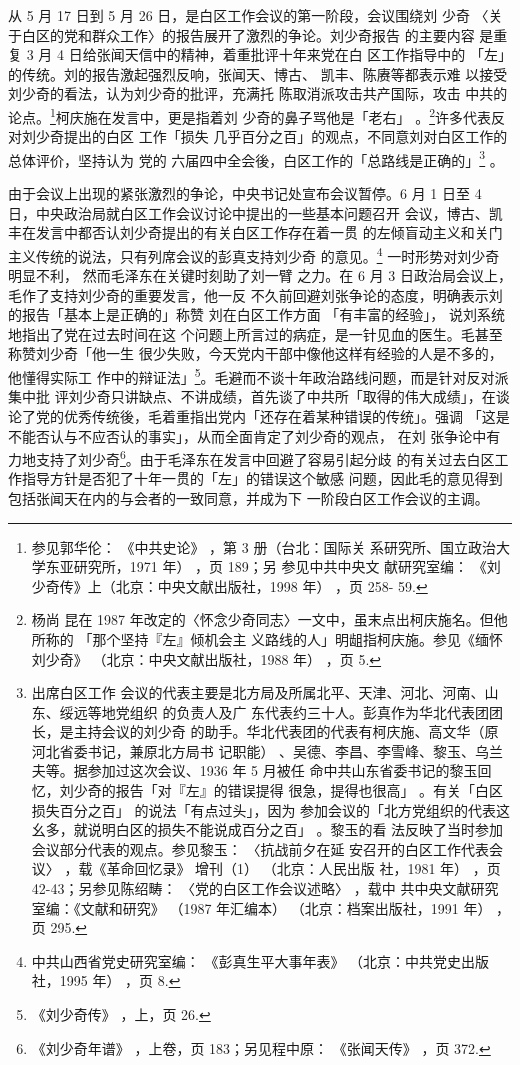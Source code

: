 从 5 月 17 日到 5 月 26 日，是白区工作会议的第一阶段，会议围绕刘 少奇
〈关于白区的党和群众工作〉的报告展开了激烈的争论。刘少奇报告 的主要内容
是重复 3 月 4 日给张闻天信中的精神，着重批评十年来党在白 区工作指导中的
「左」的传统。刘的报告激起强烈反响，张闻天、博古、 凯丰、陈赓等都表示难
以接受刘少奇的看法，认为刘少奇的批评，充满托 陈取消派攻击共产国际，攻击
中共的论点。\footnote{参见郭华伦： 《中共史论》 ，第 3 册（台北：国际关
系研究所、国立政治大学东亚研究所，1971 年） ，页 189；另 参见中共中央文
献研究室编： 《刘少奇传》上（北京：中央文献出版社，1998 年） ，页 258-
59.}柯庆施在发言中，更是指着刘 少奇的鼻子骂他是「老右」 。\footnote{杨尚
昆在 1987 年改定的〈怀念少奇同志〉一文中，虽末点出柯庆施名。但他所称的
「那个坚持『左』倾机会主 义路线的人」明龃指柯庆施。参见《缅怀刘少奇》
（北京：中央文献出版社，1988 年） ，页 5. }许多代表反对刘少奇提出的白区
工作「损失 几乎百分之百」的观点，不同意刘对白区工作的总体评价，坚持认为
党的 六届四中全会後，白区工作的「总路线是正确的」\footnote{出席白区工作
会议的代表主要是北方局及所属北平、天津、河北、河南、山东、绥远等地党组织
的负责人及广 东代表约三十人。彭真作为华北代表团团长，是主持会议的刘少奇
的助手。华北代表团的代表有柯庆施、高文华（原 河北省委书记，兼原北方局书
记职能） 、吴德、李昌、李雪峰、黎玉、乌兰夫等。据参加过这次会议、1936 年
5 月被任 命中共山东省委书记的黎玉回忆，刘少奇的报告「对『左』的错误提得
很急，提得也很高」 。有关「白区损失百分之百」 的说法「有点过头」，因为
参加会议的「北方党组织的代表这幺多，就说明白区的损失不能说成百分之百」
。黎玉的看 法反映了当时参加会议部分代表的观点。参见黎玉： 〈抗战前夕在延
安召开的白区工作代表会议〉 ，载《革命回忆录》 增刊（1） （北京：人民出版
社，1981 年） ，页 42-43；另参见陈绍畴： 〈党的白区工作会议述略〉 ，载中
共中央文献研究室编：《文献和研究》 （1987 年汇编本）
（北京：档案出版社，1991 年） ，页 295.} 。

由于会议上出现的紧张激烈的争论，中央书记处宣布会议暂停。6 月
1 日至 4 日，中央政治局就白区工作会议讨论中提出的一些基本问题召开
会议，博古、凯丰在发言中都否认刘少奇提出的有关白区工作存在着一贯
的左倾盲动主义和关门主义传统的说法，只有列席会议的彭真支持刘少奇
的意见。\footnote{中共山西省党史研究室编：
《彭真生平大事年表》
（北京：中共党史出版社，1995 年）
，页 8.} 一时形势对刘少奇明显不利，
然而毛泽东在关键时刻助了刘一臂
之力。在 6 月 3 日政治局会议上，毛作了支持刘少奇的重要发言，他一反
不久前回避刘张争论的态度，明确表示刘的报告「基本上是正确的」称赞
刘在白区工作方面
「有丰富的经验」， 说刘系统地指出了党在过去时间在这
个问题上所言过的病症，是一针见血的医生。毛甚至称赞刘少奇「他一生
很少失败，今天党内干部中像他这样有经验的人是不多的，他懂得实际工
作中的辩证法」\footnote{《刘少奇传》
，上，页 26.}。毛避而不谈十年政治路线问题，而是针对反对派集中批
评刘少奇只讲缺点、不讲成绩，首先谈了中共所「取得的伟大成绩」，在谈
论了党的优秀传统後，毛着重指出党内「还存在着某种错误的传统」。强调
「这是不能否认与不应否认的事实」，从而全面肯定了刘少奇的观点，
在刘
张争论中有力地支持了刘少奇\footnote{《刘少奇年谱》
，上卷，页 183；另见程中原：
《张闻天传》
，页 372.}。由于毛泽东在发言中回避了容易引起分歧
的有关过去白区工作指导方针是否犯了十年一贯的「左」的错误这个敏感
问题，因此毛的意见得到包括张闻天在内的与会者的一致同意，并成为下
一阶段白区工作会议的主调。

